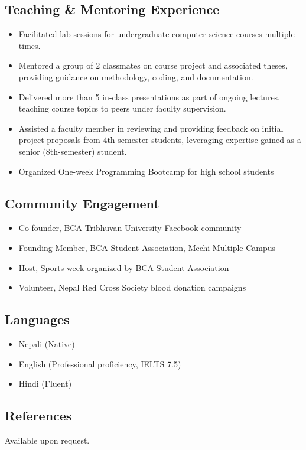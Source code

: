 \hypertarget{teaching-mentoring-experience}{%
\subsection{\texorpdfstring{\textbf{Teaching \& Mentoring
Experience}}{Teaching \& Mentoring Experience}}\label{teaching-mentoring-experience}}

\begin{itemize}
\tightlist
\item
  Facilitated lab sessions for undergraduate computer science courses
  multiple times.
\item
  Mentored a group of 2 classmates on course project and associated
  theses, providing guidance on methodology, coding, and documentation.
\item
  Delivered more than 5 in-class presentations as part of ongoing
  lectures, teaching course topics to peers under faculty supervision.
\item
  Assisted a faculty member in reviewing and providing feedback on
  initial project proposals from 4th-semester students, leveraging
  expertise gained as a senior (8th-semester) student.
\item
  Organized One-week Programming Bootcamp for high school students
\end{itemize}

\hypertarget{community-engagement}{%
\subsection{\texorpdfstring{\textbf{Community
Engagement}}{Community Engagement}}\label{community-engagement}}

\begin{itemize}
\tightlist
\item
  Co-founder, BCA Tribhuvan University Facebook community
\item
  Founding Member, BCA Student Association, Mechi Multiple Campus
\item
  Host, Sports week organized by BCA Student Association
\item
  Volunteer, Nepal Red Cross Society blood donation campaigns
\end{itemize}

\hypertarget{languages}{%
\subsection{\texorpdfstring{\textbf{Languages}}{Languages}}\label{languages}}

\begin{itemize}
\tightlist
\item
  Nepali (Native)
\item
  English (Professional proficiency, IELTS 7.5)
\item
  Hindi (Fluent)
\end{itemize}

\hypertarget{references}{%
\subsection{\texorpdfstring{\textbf{References}}{References}}\label{references}}

Available upon request.
